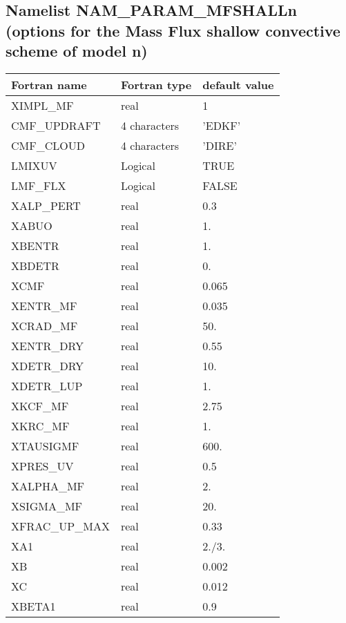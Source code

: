 \subsection{Namelist NAM\_PARAM\_MFSHALLn (options for the Mass Flux shallow convective
scheme of model n)}


\begin{center}
\begin{tabular} {|l|l|l|}
\hline
Fortran name & Fortran type & default value \\
\hline
XIMPL\_MF      &  real         &   1        \\
CMF\_UPDRAFT   &  4 characters &   'EDKF'   \\
CMF\_CLOUD     &  4 characters &   'DIRE'   \\
LMIXUV         &  Logical      &    TRUE    \\ 
LMF\_FLX       &  Logical      &    FALSE   \\
XALP\_PERT     &  real         &    0.3     \\
XABUO          &  real         &    1.      \\
XBENTR         &   real        &    1.      \\
XBDETR         &  real         &    0.      \\
XCMF           &  real         &    0.065   \\
XENTR\_MF      &  real         &    0.035   \\
XCRAD\_MF      &  real         &    50.     \\
XENTR\_DRY     &  real         &    0.55    \\
XDETR\_DRY     &  real         &    10.     \\
XDETR\_LUP     &  real         &    1.      \\
XKCF\_MF       &  real         &    2.75    \\
XKRC\_MF       &  real         &    1.      \\
XTAUSIGMF      &  real         &    600.    \\
XPRES\_UV      &  real         &    0.5     \\
XALPHA\_MF     &  real         &    2.      \\
XSIGMA\_MF     &  real         &    20.     \\
XFRAC\_UP\_MAX &  real         &    0.33    \\
XA1            &  real         &    2./3.   \\
XB             &  real         &    0.002   \\
XC             &  real         &    0.012   \\
XBETA1         &  real         &    0.9     \\

\hline

\end{tabular}
\end{center}

